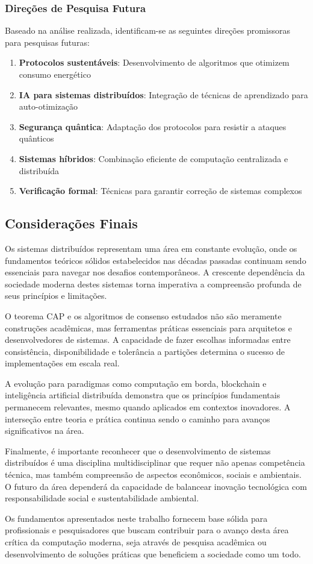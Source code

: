 \subsubsection{Direções de Pesquisa Futura}

Baseado na análise realizada, identificam-se as seguintes direções promissoras para pesquisas futuras:

\begin{enumerate}
    \item \textbf{Protocolos sustentáveis}: Desenvolvimento de algoritmos que otimizem consumo energético
    \item \textbf{IA para sistemas distribuídos}: Integração de técnicas de aprendizado para auto-otimização
    \item \textbf{Segurança quântica}: Adaptação dos protocolos para resistir a ataques quânticos
    \item \textbf{Sistemas híbridos}: Combinação eficiente de computação centralizada e distribuída
    \item \textbf{Verificação formal}: Técnicas para garantir correção de sistemas complexos
\end{enumerate}

\subsection{Considerações Finais}

Os sistemas distribuídos representam uma área em constante evolução, onde os fundamentos teóricos sólidos estabelecidos nas décadas passadas continuam sendo essenciais para navegar nos desafios contemporâneos. A crescente dependência da sociedade moderna destes sistemas torna imperativa a compreensão profunda de seus princípios e limitações.

O teorema CAP e os algoritmos de consenso estudados não são meramente construções acadêmicas, mas ferramentas práticas essenciais para arquitetos e desenvolvedores de sistemas. A capacidade de fazer escolhas informadas entre consistência, disponibilidade e tolerância a partições determina o sucesso de implementações em escala real.

A evolução para paradigmas como computação em borda, blockchain e inteligência artificial distribuída demonstra que os princípios fundamentais permanecem relevantes, mesmo quando aplicados em contextos inovadores. A interseção entre teoria e prática continua sendo o caminho para avanços significativos na área.

Finalmente, é importante reconhecer que o desenvolvimento de sistemas distribuídos é uma disciplina multidisciplinar que requer não apenas competência técnica, mas também compreensão de aspectos econômicos, sociais e ambientais. O futuro da área dependerá da capacidade de balancear inovação tecnológica com responsabilidade social e sustentabilidade ambiental.

Os fundamentos apresentados neste trabalho fornecem base sólida para profissionais e pesquisadores que buscam contribuir para o avanço desta área crítica da computação moderna, seja através de pesquisa acadêmica ou desenvolvimento de soluções práticas que beneficiem a sociedade como um todo.
